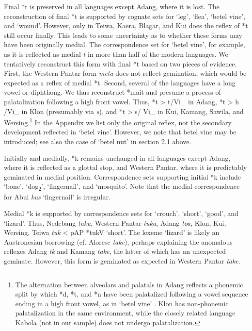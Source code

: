 Final *t is preserved in all languages except Adang, where it is lost. The reconstruction of final *t is supported by cognate sets for `leg', `flea', `betel vine', and `wound'. However, only in Teiwa, Kaera, Blagar, and Kui does the reflex of *t still occur finally. This leads to some uncertainty as to whether these forms may have been originally medial. The correspondence set for `betel vine', for example, as it is reflected as medial \textit{t} in more than half of the modern languages. We tentatively reconstruct this form with final *t based on two pieces of evidence. First, the Western Pantar form \textit{meta} does not reflect gemination, which would be expected as a reflex of medial *t. Second, several of the languages have a long vowel or diphthong. We thus reconstruct *mait and presume a process of palatalization following a high front vowel. Thus, *t {\textgreater} t{\textesh}/Vi\_ in Adang, *t {\textgreater} h /Vi\_ in Klon (presumably via \textit{s}), and *t {\textgreater} s/ Vi\_ in Kui, Kamang, 
Sawila, and Wersing.\footnote{ The alternation between alveolars and palatals in Adang reflects a phonemic split by which *d, *t, and *n have been palatalized following a vowel sequence ending in a high front vowel, as in `betel vine' \citep{RobinsonEtAlforthcoming}. Klon has non-phonemic palatalization in the same environment, while the closely related language Kabola (not in our sample) does not undergo palatalization.} In the Appendix we list only the original reflex, not the secondary development reflected in `betel vine'. However, we note that betel vine may be introduced; see also the case of `betel nut' in section 2.1 above. 

Initially and medially, *k remains unchanged in all languages except Adang, where it is reflected as a glottal stop, and Western Pantar, where it is predictably geminated in medial position. Correspondence sets supporting initial *k include `bone', `dog\textsubscript{2}', `fingernail', and `mosquito'. Note that the medial correspondence for Abui \textit{kus{\textsci}{\ng}} `fingernail' is irregular. 

Medial *k is supported by correspondence sets for `crouch', `short', `good', and `lizard'. Thus, Nedebang \textit{tuku}, Western Pantar \textit{tuk{\textlengthmark}a}, Adang \textit{to{\textglotstop}a{\ng}}, Klon, Kui, Wersing, Teiwa \textit{tuk }{\textless} pAP *tukV `short'. The lexeme `lizard' is likely an Austronesian borrowing (cf. Alorese \textit{take}), perhaps explaining the anomalous reflexes Adang \textit{t{\textepsilon}k{\textopeno}} and Kamang \textit{tak{\textlengthmark}e{\textlengthmark}}, the latter of which has an unexpected geminate\textit{. }However, this form is geminated as expected in Western Pantar \textit{tak{\textlengthmark}e}.

